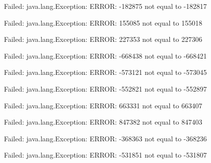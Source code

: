 Failed: java.lang.Exception: ERROR: -182875 not equal to -182817

Failed: java.lang.Exception: ERROR: 155085 not equal to 155018

Failed: java.lang.Exception: ERROR: 227353 not equal to 227306

Failed: java.lang.Exception: ERROR: -668438 not equal to -668421

Failed: java.lang.Exception: ERROR: -573121 not equal to -573045

Failed: java.lang.Exception: ERROR: -552821 not equal to -552897

Failed: java.lang.Exception: ERROR: 663331 not equal to 663407

Failed: java.lang.Exception: ERROR: 847382 not equal to 847403

Failed: java.lang.Exception: ERROR: -368363 not equal to -368236

Failed: java.lang.Exception: ERROR: -531851 not equal to -531807
